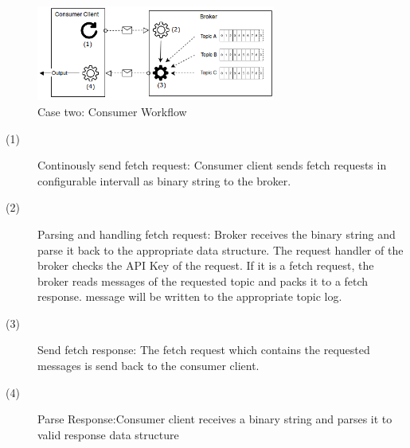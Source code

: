 \begin{figure}[H]
    \centering
   \includegraphics[width=0.7\textwidth]{images/concept_consumer.png}
    \caption{Case two: Consumer Workflow}
    \label{fig:concept-consumer}
\end{figure}

\begin{description}
    \item [(1)] 
        {Continously send fetch request: Consumer client sends fetch
        requests in configurable intervall as binary string to the broker. } 
    \item [(2)] 
        {Parsing and handling fetch request: Broker receives the binary string
            and parse it back to the appropriate data structure. The request
            handler of the broker checks the API Key of the request. If it is a
            fetch request, the broker reads messages of the requested topic and
            packs it to a fetch response. message will be written to the
            appropriate topic log.}
    \item [(3)] 
        {Send fetch response: The fetch request which contains the requested
        messages is send back to the consumer client.}
    \item [(4)] 
        {Parse Response:Consumer client receives a binary string and parses it
        to valid response data structure }
\end{description}

